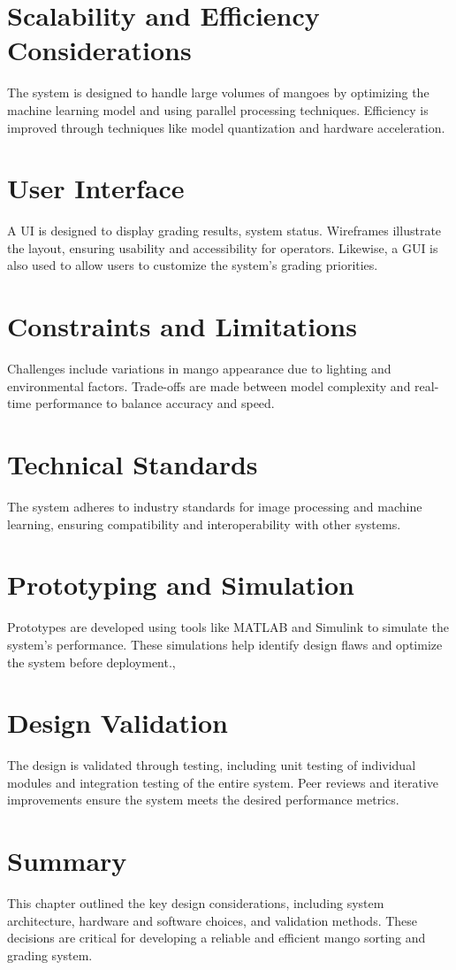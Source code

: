 \section{Scalability and Efficiency Considerations}
The system is designed to handle large volumes of mangoes by optimizing the machine learning model and using parallel processing techniques. Efficiency is improved through techniques like model quantization and hardware acceleration.

\section{User Interface}
A \gls{UI} is designed to display grading results, system status. Wireframes illustrate the layout, ensuring usability and accessibility for operators. 
Likewise, a \gls{GUI} is also used to allow users to customize the system's grading priorities.

\section{Constraints and Limitations}
Challenges include variations in mango appearance due to lighting and environmental factors. Trade-offs are made between model complexity and real-time performance to balance accuracy and speed.

\section{Technical Standards}
The system adheres to industry standards for image processing and machine learning, ensuring compatibility and interoperability with other systems.

\section{Prototyping and Simulation}
Prototypes are developed using tools like MATLAB and Simulink to simulate the system’s performance. These simulations help identify design flaws and optimize the system before deployment.,

\section{Design Validation}
The design is validated through testing, including unit testing of individual modules and integration testing of the entire system. Peer reviews and iterative improvements ensure the system meets the desired performance metrics.

\section{Summary}
This chapter outlined the key design considerations, including system architecture, hardware and software choices, and validation methods. These decisions are critical for developing a reliable and efficient mango sorting and grading system.









